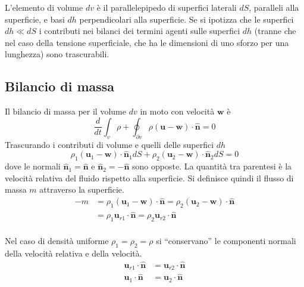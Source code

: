 L'elemento di volume $dv$ è il parallelepipedo di superfici laterali $dS$, paralleli alla superficie, e basi $dh$ perpendicolari
 alla superficie. Se si ipotizza che le superfici $dh \ll dS$ i contributi nei bilanci dei termini agenti sulle superfici $dh$
 (tranne che nel caso della tensione superficiale, che ha le dimensioni di uno sforzo per una lunghezza) sono trascurabili.


\subsection{Bilancio di massa}
Il bilancio di massa per il volume $dv$  in moto con velocità $\bm{w}$ è
\begin{equation}
 \dfrac{d}{dt}\int_{v} \rho + \oint_{\partial v} \rho (\bm{u} - \bm{w} ) \cdot \bm{\hat{n}} = 0
\end{equation}
Trascurando i contributi di volume e quelli delle superfici $dh$
\begin{equation}
 \rho_1 (\bm{u}_1 - \bm{w} ) \cdot \bm{\hat{n}}_1 dS +  \rho_2 (\bm{u}_2 - \bm{w} ) \cdot \bm{\hat{n}}_2 dS = 0
\end{equation}
dove le normali $\bm{\hat{n}}_1 = \bm{\hat{n}}$ e $\bm{\hat{n}}_2 = -\bm{\hat{n}}$ sono opposte. La quantità tra parentesi è la velocità relativa
 del fluido rispetto alla superficie. Si definisce quindi il flusso di massa $m$ attraverso la superficie.
\begin{equation}
\begin{aligned}
 - m & = \rho_1 (\bm{u}_1 - \bm{w} ) \cdot \bm{\hat{n}} = \rho_2 (\bm{u}_2 - \bm{w} ) \cdot \bm{\hat{n}} \\
   & = \rho_1  \bm{u}_{r1} \cdot \bm{\hat{n}} = \rho_2 \bm{u}_{r2} \cdot \bm{\hat{n}} \\
\end{aligned}
\end{equation}

\noindent
Nel caso di densità uniforme $\rho_1 = \rho_2 = \rho$ si ``conservano'' le componenti normali della velocità relativa e della
 velocità.
\begin{equation}
\begin{aligned}
  \bm{u}_{r1} \cdot \bm{\hat{n}} & = \bm{u}_{r2} \cdot \bm{\hat{n}} \\
  \bm{u}_{1}  \cdot \bm{\hat{n}} & = \bm{u}_{2}  \cdot \bm{\hat{n}} \\
\end{aligned}
\end{equation}


